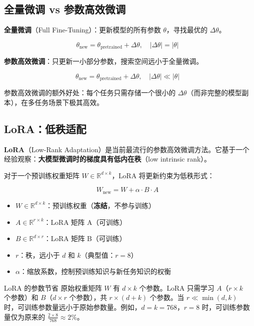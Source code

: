 \documentclass[a4paper]{article}
\begin{document}
\subsection{全量微调 vs 参数高效微调}

\textbf{全量微调}（Full Fine-Tuning）：更新模型的所有参数 $\theta$，寻找最优的 $\Delta\theta$。

$$\theta_{\text{new}} = \theta_{\text{pretrained}} + \Delta\theta, \quad |\Delta\theta| = |\theta|$$

\textbf{参数高效微调}：只更新一小部分参数，搜索空间远小于全量微调。

$$\theta_{\text{new}} = \theta_{\text{pretrained}} + \Delta\theta, \quad |\Delta\theta| \ll |\theta|$$





参数高效微调的额外好处：每个任务只需存储一个很小的 $\Delta\theta$（而非完整的模型副本），在多任务场景下极其高效。

\subsection{LoRA：低秩适配}

\textbf{LoRA}（Low-Rank Adaptation）是当前最流行的参数高效微调方法。它基于一个经验观察：\textbf{大模型微调时的梯度具有低内在秩}（low intrinsic rank）。





对于一个预训练权重矩阵 $W \in \mathbb{R}^{d \times k}$，LoRA 将更新约束为低秩形式：

$$W_{\text{new}} = W + \alpha \cdot B \cdot A$$

\begin{itemize}
    \item $W \in \mathbb{R}^{d \times k}$：预训练权重（\textbf{冻结}，不参与训练）
    \item $A \in \mathbb{R}^{r \times k}$：LoRA 矩阵 A（可训练）
    \item $B \in \mathbb{R}^{d \times r}$：LoRA 矩阵 B（可训练）
    \item $r$：秩，远小于 $d$ 和 $k$（典型值：$r = 8$）
    \item $\alpha$：缩放系数，控制预训练知识与新任务知识的权衡
\end{itemize}

\begin{importantbox}{LoRA 的参数节省}
原始权重矩阵 $W$ 有 $d \times k$ 个参数。LoRA 只需学习 $A$（$r \times k$ 个参数）和 $B$（$d \times r$ 个参数），共 $r \times (d + k)$ 个参数。当 $r \ll \min(d, k)$ 时，可训练参数量远小于原始参数量。例如，$d = k = 768$，$r = 8$ 时，可训练参数量仅为原来的 $\frac{2 \times 8}{768} \approx 2\%$。
\end{importantbox}
\end{document}
